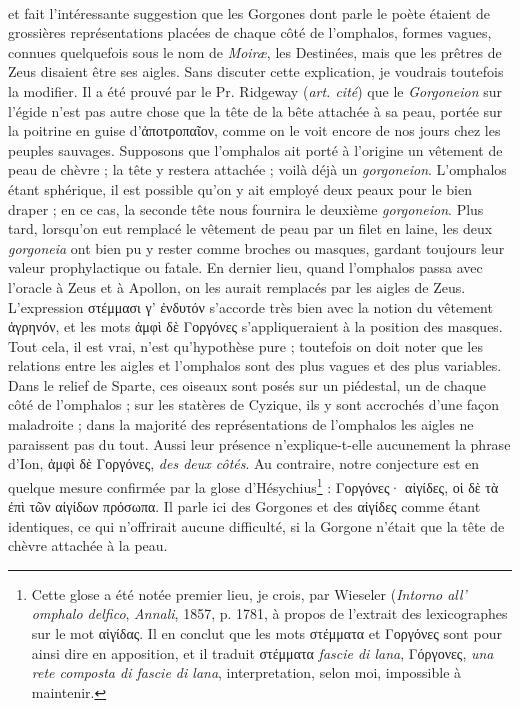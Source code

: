 \documentclass[a4paper, 11pt, oneside, polutonikogreek, french]{article}
\begin{document}
\paragraph{}
et fait l'intéressante suggestion que les Gorgones dont parle le poète étaient de grossières représentations placées de chaque côté de l'omphalos, formes vagues, connues quelquefois sous le nom de \emph{Moiræ}, les Destinées, mais que les prêtres de Zeus disaient être ses aigles. Sans discuter cette explication, je voudrais toutefois la modifier. Il a été prouvé par le Pr. Ridgeway (\emph{art. cité}) que le \emph{Gorgoneion} sur l'égide n'est pas autre chose que la tête de la bête attachée à sa peau, portée sur la poitrine en guise d'ἀποτροπαῖον, comme on le voit encore de nos jours chez les peuples sauvages. Supposons que l'omphalos ait porté à l'origine un vêtement de peau de chèvre ; la tête y restera attachée ; voilà déjà un \emph{gorgoneion}. L'omphalos étant sphérique, il est possible qu'on y ait employé deux peaux pour le bien draper ; en ce cas, la seconde tête nous fournira le deuxième \emph{gorgoneion}. Plus tard, lorsqu'on eut remplacé le vêtement de peau par un filet en laine, les deux \emph{gorgoneia} ont bien pu y rester comme broches ou masques, gardant toujours leur valeur prophylactique ou fatale. En dernier lieu, quand l'omphalos passa avec l'oracle à Zeus et à Apollon, on les aurait remplacés par les aigles de Zeus. L'expression στέμμασι γ' ἐνδυτόν s'accorde très bien avec la notion du vêtement ἀγρηνόν, et les mots ἀμφὶ δὲ Γοργόνες s'appliqueraient à la position des masques. Tout cela, il est vrai, n'est qu'hypothèse pure ; toutefois on doit noter que les relations entre les aigles et l'omphalos sont des plus vagues et des plus variables. Dans le relief de Sparte, ces oiseaux sont posés sur un piédestal, un de chaque côté de l'omphalos ; sur les statères de Cyzique, ils y sont accrochés d'une façon maladroite ; dans la majorité des représentations de l'omphalos les aigles ne paraissent pas du tout. Aussi leur présence n'explique-t-elle aucunement la phrase d'Ion, ἀμφὶ δὲ Γοργόνες, \emph{des deux côtés}. Au contraire, notre conjecture est en quelque mesure confirmée par la glose d'Hésychius\footnote{Cette glose a été notée premier lieu, je crois, par Wieseler (\emph{Intorno all' omphalo delfico}, \emph{Annali}, 1857, p. 1781, à propos de l'extrait des lexicographes sur le mot αἰγίδας. Il en conclut que les mots στέμματα et Γοργόνες sont pour ainsi dire en apposition, et il traduit στέμματα \emph{fascie di lana}, Γόργονες, \emph{una rete composta di fascie di lana}, interpretation, selon moi, impossible à maintenir.} : Γοργόνες· αἰγίδες, οἱ δὲ τὰ ἐπὶ τῶν αἰγίδων πρόσωπα. Il parle ici des Gorgones et des αἰγίδες comme étant identiques, ce qui n'offrirait aucune difficulté, si la Gorgone n'était que la tête de chèvre attachée à la peau.
\end{document}

